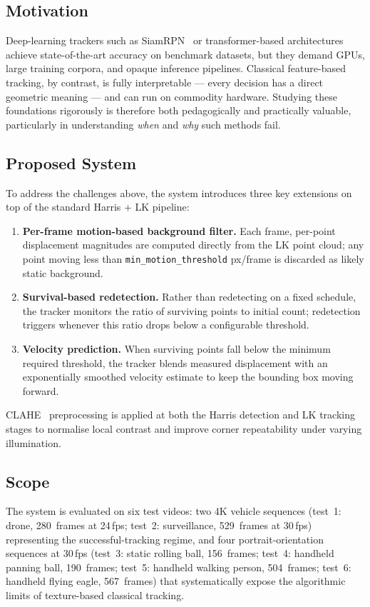\documentclass[12pt,a4paper]{article}
\begin{document}
\subsection{Motivation}
Deep-learning trackers such as SiamRPN~\cite{siamrpn} or transformer-based architectures
achieve state-of-the-art accuracy on benchmark datasets, but they demand GPUs, large training
corpora, and opaque inference pipelines. Classical feature-based tracking, by contrast, is fully
interpretable --- every decision has a direct geometric meaning --- and can run on commodity
hardware. Studying these foundations rigorously is therefore both pedagogically and practically
valuable, particularly in understanding \emph{when} and \emph{why} such methods fail.

\subsection{Proposed System}
To address the challenges above, the system introduces three key extensions on top of the
standard Harris + LK pipeline:
\begin{enumerate}[leftmargin=1.8em]
  \item \textbf{Per-frame motion-based background filter.} Each frame, per-point
    displacement magnitudes are computed directly from the LK point cloud; any point
    moving less than \texttt{min\_motion\_threshold} px/frame is discarded as likely
    static background.
  \item \textbf{Survival-based redetection.} Rather than redetecting on a fixed schedule,
    the tracker monitors the ratio of surviving points to initial count; redetection triggers
    whenever this ratio drops below a configurable threshold.
  \item \textbf{Velocity prediction.} When surviving points fall below the minimum required
    threshold, the tracker blends measured displacement with an exponentially smoothed
    velocity estimate to keep the bounding box moving forward.
\end{enumerate}
CLAHE~\cite{clahe} preprocessing is applied at both the Harris detection and LK tracking
stages to normalise local contrast and improve corner repeatability under varying illumination.

\subsection{Scope}
The system is evaluated on six test videos: two 4K vehicle sequences (test~1: drone,
280~frames at 24\,fps; test~2: surveillance, 529~frames at 30\,fps) representing the
successful-tracking regime, and four portrait-orientation sequences at 30\,fps (test~3:
static rolling ball, 156~frames; test~4: handheld panning ball, 190~frames; test~5:
handheld walking person, 504~frames; test~6: handheld flying eagle, 567~frames) that
systematically expose the algorithmic limits of texture-based classical tracking.
\end{document}
